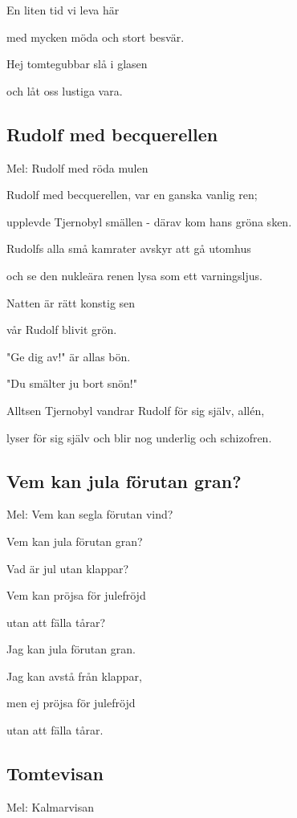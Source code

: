 En liten tid vi leva här

med mycken möda och stort besvär.

Hej tomtegubbar slå i glasen

och låt oss lustiga vara. 

\subsection{\textbf{Rudolf med becquerellen}}

Mel: Rudolf med röda mulen\bigskip

Rudolf med becquerellen, var en ganska vanlig ren;

upplevde Tjernobyl smällen - därav kom hans gröna sken.

Rudolfs alla små kamrater avskyr att gå utomhus

och se den nukleära renen lysa som ett varningsljus.\bigskip

Natten är rätt konstig sen

vår Rudolf blivit grön.

"Ge dig av!" är allas bön.

"Du smälter ju bort snön!"\bigskip

Alltsen Tjernobyl vandrar Rudolf för sig själv, allén,

lyser för sig själv och blir nog underlig och schizofren. 

\subsection{\textbf{Vem kan jula förutan gran? }}

Mel: Vem kan segla förutan vind?\bigskip

Vem kan jula förutan gran?

Vad är jul utan klappar?

Vem kan pröjsa för julefröjd

utan att fälla tårar? \bigskip

Jag kan jula förutan gran.

Jag kan avstå från klappar,

men ej pröjsa för julefröjd

utan att fälla tårar. 

\subsection{\textbf{Tomtevisan}}

Mel: Kalmarvisan\bigskip


